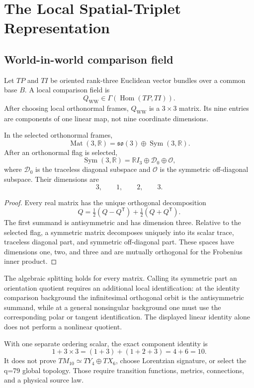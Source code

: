 \documentclass[11pt]{article}
\newcommand{\WW}{Q_{\mathrm{WW}}}
\newcommand{\Dzero}{\mathcal D_0}
\newcommand{\Off}{\mathcal O}
\newcommand{\Hom}{\operatorname{Hom}}
\begin{document}
\section{The Local Spatial-Triplet Representation}

\subsection{World-in-world comparison field}

Let $TP$ and $TI$ be oriented rank-three Euclidean vector bundles over a
common base $B$.  A local comparison field is
\[
 \WW\in\Gamma\!\left(\Hom(TP,TI)\right).
\]
After choosing local orthonormal frames, $\WW$ is a $3\times3$ matrix.  Its
nine entries are components of one linear map, not nine coordinate
dimensions.

\begin{theorem}
\label{thm:spatial}
In the selected orthonormal frames,
\[
 \operatorname{Mat}(3,\mathbb R)
 =
 \mathfrak{so}(3)\oplus\operatorname{Sym}(3,\mathbb R).
\]
After an orthonormal flag is selected,
\[
 \operatorname{Sym}(3,\mathbb R)
 =
 \mathbb RI_3\oplus\Dzero\oplus\Off,
\]
where $\Dzero$ is the traceless diagonal subspace and $\Off$ is the symmetric
off-diagonal subspace.  Their dimensions are
\[
 3,\qquad 1,\qquad 2,\qquad 3.
\]
\end{theorem}

\begin{proof}
Every real matrix has the unique orthogonal decomposition
\[
 Q=\tfrac12(Q-Q^\mathsf T)+\tfrac12(Q+Q^\mathsf T).
\]
The first summand is antisymmetric and has dimension three.  Relative to the
selected flag, a symmetric matrix decomposes uniquely into its scalar trace,
traceless diagonal part, and symmetric off-diagonal part.  These spaces have
dimensions one, two, and three and are mutually orthogonal for the Frobenius
inner product.
\end{proof}

The algebraic splitting holds for every matrix. Calling its symmetric
part an orientation quotient requires an additional local identification:
at the identity comparison background the infinitesimal orthogonal orbit
is the antisymmetric summand, while at a general nonsingular background
one must use the corresponding polar or tangent identification. The
displayed linear identity alone does not perform a nonlinear quotient.

With one separate ordering scalar, the exact component identity is
\[
 1+3\times3=(1+3)+(1+2+3)=4+6=10.
\]
It does not prove
$TM_{10}\simeq TY_4\oplus TX_6$, choose Lorentzian signature, or select the
q=79 global topology.  Those require transition functions, metrics,
connections, and a physical source law.
\end{document}
